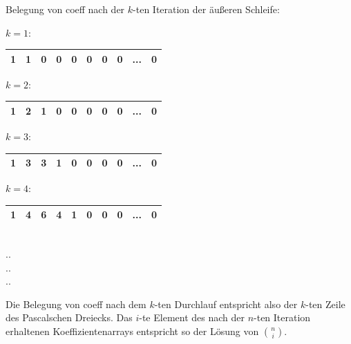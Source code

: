 \documentclass{article}
\newenvironment{algorithmic}{%
\renewenvironment{algocf}[1][h]{}{}%
\algorithm
}{%
\endalgorithm
}
\begin{document}
\begin{algorithmic}[H]
    \small
%
%
\end{algorithmic}
Belegung von coeff nach der $k$-ten Iteration der äußeren Schleife:\\

\begin{center}
 $k=1$:
  \begin{tabular}{ | c | c | c | c | c | c | c | c | c | c |  }
    \hline
    1 & 1 & 0 & 0 & 0 & 0 & 0 & 0 &... & 0\\ \hline
  \end{tabular}
\end{center}

\begin{center}
 $k=2$:
 \begin{tabular}{ | c | c | c | c | c | c | c | c | c | c |  }
    \hline
    1 & 2 & 1 & 0 & 0 & 0 & 0 & 0 &... & 0\\ \hline
  \end{tabular}
\end{center}

\begin{center}
 $k=3$:
 \begin{tabular}{ | c | c | c | c | c | c | c | c | c | c |  }
    \hline
    1 & 3 & 3 & 1 & 0 & 0 & 0 & 0 &... & 0\\ \hline
  \end{tabular}
\end{center}

\begin{center}
 $k=4$:
 \begin{tabular}{ | c | c | c | c | c | c | c | c | c | c |  }
    \hline
    1 & 4 & 6  & 4 & 1 & 0 & 0 & 0 &... & 0\\ \hline
  \end{tabular}\\
..\\
..\\
..\\
\end{center}
Die Belegung von coeff nach dem $k$-ten Durchlauf entspricht also der $k$-ten Zeile des Pascalschen Dreiecks. Das $i$-te Element des nach der $n$-ten Iteration erhaltenen Koeffizientenarrays entspricht so der Lösung von $\binom{n}{i}$.
\end{document}
